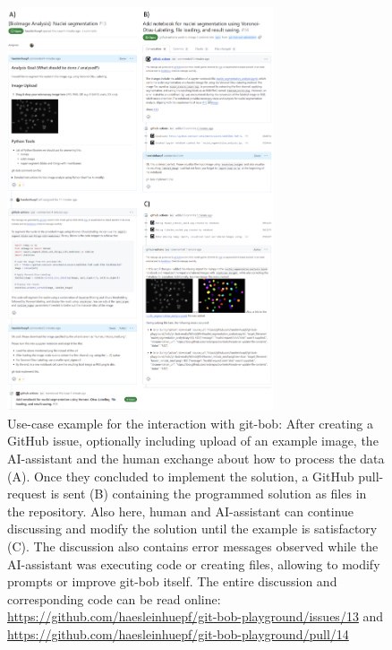 \documentclass[times, twoside]{zHenriquesLab-StyleBioRxiv}
\begin{document}
\begin{figure}[h]
\centering
\includegraphics[width=0.7\textwidth]{example_interaction.png}
\caption{Use-case example for the interaction with git-bob: After creating a GitHub issue, optionally including upload of an example image, the AI-assistant and the human exchange about how to process the data (A). Once they concluded to implement the solution, a GitHub pull-request is sent (B) containing the programmed solution as files in the repository. Also here, human and AI-assistant can continue discussing and modify the solution until the example is satisfactory (C). The discussion also contains error messages observed while the AI-assistant was executing code or creating files, allowing to modify prompts or improve git-bob itself. The entire discussion and corresponding code can be read online: \url{https://github.com/haesleinhuepf/git-bob-playground/issues/13} and \url{https://github.com/haesleinhuepf/git-bob-playground/pull/14}
\newline
\newline
}
\label{fig:example_interaction}
\end{figure}
\end{document}
